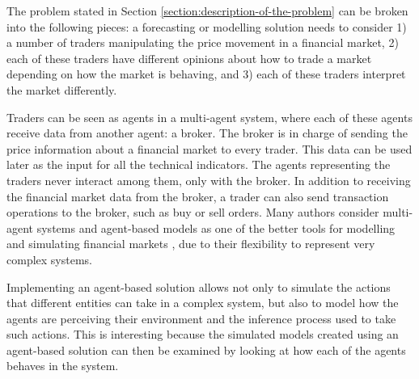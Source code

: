 The problem stated in Section \ref{section:description-of-the-problem} can be
broken into the following pieces: a forecasting or modelling solution needs to
consider 1) a number of traders manipulating the price movement in a financial
market, 2) each of these traders have different opinions about how to trade a
market depending on how the market is behaving, and 3) each of these traders
interpret the market differently.

Traders can be seen as agents in a multi-agent system, where each of these
agents receive data from another agent: a broker. The broker is in charge of
sending the price information about a financial market to every trader. This
data can be used later as the input for all the technical indicators. The agents
representing the traders never interact among them, only with the broker. In
addition to receiving the financial market data from the broker, a trader can
also send transaction operations to the broker, such as buy or sell orders. Many
authors consider multi-agent systems and agent-based models as one of the better
tools for modelling and simulating financial markets \cite{Lebaron2001}
\cite{Gamil2007} \cite{Boer-Sorban2008}, due to their flexibility to represent
very complex systems.

Implementing an agent-based solution allows not only to simulate the actions
that different entities can take in a complex system, but also to model how the
agents are perceiving their environment and the inference process used to take
such actions. This is interesting because the simulated models created using an
agent-based solution can then be examined by looking at how each of the agents
behaves in the system.



